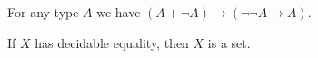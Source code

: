 \documentclass[hott-all.tex]{subfiles}
\begin{document}
% 
\begin{lem}
For any type $A$ we have $(A+\neg A)\to(\neg\neg A\to A)$.
\end{lem}
% 
% 
\begin{thm}[Hedberg]
  If $X$ has decidable equality, then $X$ is a set.
\end{thm}
% 
% 
% 
\end{document}
